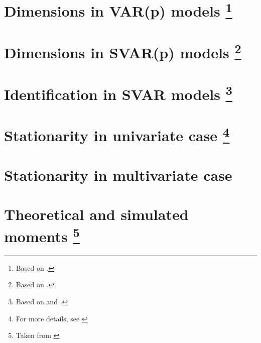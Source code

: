 \documentclass[11pt]{article}
\newcommand*{\varp}[1][p]{VAR(#1)}
\newcommand*{\svar}{SVAR}
\newcommand*{\svarp}[1][p]{SVAR(#1)}
\begin{document}
\section{Dimensions in \texorpdfstring{\varp{}}{VAR} models\texorpdfstring{%
      \protect\footnote{Based on \cite[][see the section 17, titled ``Dimensions and VAR(1) representation'']{Mutschler-2018-github_repo}.}%
  }{}
 }


\section{Dimensions in \texorpdfstring{\svarp{}}{SVAR} models\texorpdfstring{%
      \protect\footnote{Based on \cite[][see the section 17, titled ``Dimensions and VAR(1) representation'']{Mutschler-2018-github_repo}.}%
  }{}}


\section{Identification in \texorpdfstring{\svar{}}{SVAR} models\texorpdfstring{%
      \protect\footnote{Based on \cite[][see pages 332-334]{Hamilton-1994} and \cite[][see chapter 14]{MartinHurnHarris-2012}.}%
  }{}}


\section{Stationarity in univariate case\texorpdfstring{%
      \protect\footnote{For more details, see \cite[][see Chapter 3, Stationary ARMA processes]{Hamilton-1994}}%
  }{}}


\section{Stationarity in multivariate case}


\section{Theoretical and simulated moments\texorpdfstring{%
      \protect\footnote{Taken from \cite[][see Section 18, ``Theoretical and simulated moments"]{Mutschler-2018-github_repo}}%
  }{}}

\end{document}
